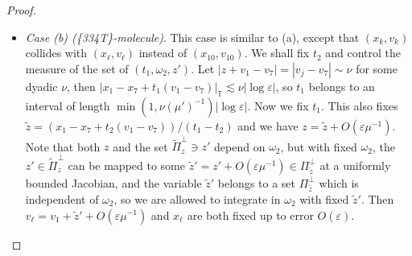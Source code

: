 \documentclass[10pt, reqno]{amsart}
\newcommand{\Tb}{\mathbb T}
\newcommand{\Xc}{\mathcal X}
\theoremstyle{definition}
\theoremstyle{remark}
\numberwithin{equation}{section}
\begin{document}
\begin{proof}
\begin{itemize}
Let $|X|\sim\sigma$ for some dyadic $\sigma$, then $t_2$ belongs to an interval of length $\min(1,\sigma(\mu')^{-1})|\log\varepsilon|$ since $|v_7-v_{10}|\gtrsim\mu'$. Moreover, with $t_2$ fixed, by the inequality $|X\times (v_{10}-v_k)|=O(\varepsilon)$, we know the $z''$ given by (\ref{eq.whatever}) belongs to a tube $\Xc$ of size $|\log\varepsilon|^{C^*}$ in one dimension and $\min(1,\varepsilon\sigma^{-1})$ in all other $(d-1)$ dimensions. With $t_1$ and $t_2$ fixed, the value of $z$ is also fixed (up to perturbation $O(\varepsilon)$) as in (\ref{eq.333proof_ex}). Note that the $z''$ defined by (\ref{eq.whatever}) belongs to a sphere of radius $\rho=|z+v_1-v_7|/2\gtrsim \mu'|\log\varepsilon|^{-1}$ which is parametrized by $\omega_2$. The intersection of the tube $\Xc$ with this sphere equals a subset of the sphere with diameter $O(\min(1,\varepsilon^{1/2}\sigma^{-1/2}\rho^{1/2}))$, which implies that $\omega_2$ belongs to a set of measure $\lesssim\min(1,\varepsilon^{1/2}\sigma^{-1/2}(\mu')^{-1/2})|\log\varepsilon|$. Putting together the above estimates for $t_2$ and $\omega_2$, we have proved (\ref{eq.334proofint0}). Note the order of integration here is: $z'$, then $\omega_2$, then $t_2$, then $t_1$.
\item \emph{Case (b) (\{334T\}-molecule)}. This case is similar to (a), except that $(x_k,v_k)$ collides with $(x_\ell,v_\ell)$ instead of $(x_{10},v_{10})$. We shall fix $t_2$ and control the measure of the set of $(t_1,\omega_2,z')$. Let $|z+v_1-v_7|=|v_j-v_7|\sim\nu$ for some dyadic $\nu$, then $|x_1-x_7+t_1(v_1-v_7)|_\Tb\lesssim\nu|\log\varepsilon|$, so $t_1$ belongs to an interval of length $\min(1,\nu(\mu')^{-1})|\log\varepsilon|$. Now we fix $t_1$. This also fixes $\widetilde{z}=(x_1-x_7+t_2(v_1-v_7))/(t_1-t_2)$ and we have $z=\widetilde{z}+O(\varepsilon\mu^{-1})$. Note that both $z$ and the set $\widetilde{\Pi}_z^\perp\ni z'$ depend on $\omega_2$, but with fixed $\omega_2$, the $z'\in \widetilde{\Pi}_z^\perp$ can be mapped to some $\widetilde{z}'=z'+O(\varepsilon\mu^{-1})\in\Pi_{\widetilde{z}}^\perp$ at a uniformly bounded Jacobian, and the variable $\widetilde{z}'$ belongs to a set $\Pi_{\widetilde{z}}^\perp$ which is independent of $\omega_2$, so we are allowed to integrate in $\omega_2$ with fixed $\widetilde{z}'$. Then $v_\ell=v_1+\widetilde{z}'+O(\varepsilon\mu^{-1})$ and $x_\ell$ are both fixed up to error $O(\varepsilon)$.


\end{itemize}
\end{proof}
\end{document}
